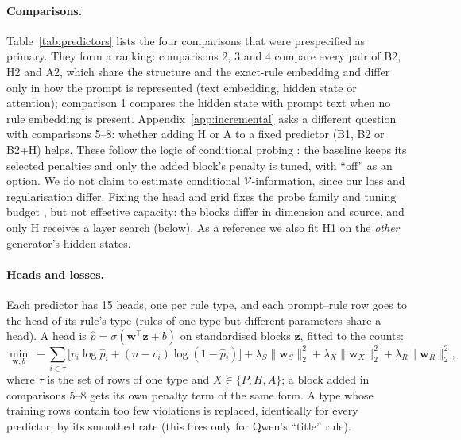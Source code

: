 \documentclass{article}
\newcommand{\blk}[1]{\textsf{#1}}
\begin{document}
\paragraph{Comparisons.} Table~\ref{tab:predictors} lists the four comparisons that were prespecified as primary. They
form a ranking: comparisons 2, 3 and 4 compare every pair of B2, H2 and A2, which share the structure and the
exact-rule embedding and differ only in how the prompt is represented (text embedding, hidden state or attention);
comparison 1 compares the hidden state with prompt text when no rule embedding is present. Appendix~\ref{app:incremental}
asks a different question with comparisons 5--8: whether adding \blk{H} or \blk{A} to a fixed predictor (B1, B2 or
B2+H) helps. These follow the logic of conditional probing \citep{hewitt2021conditional}: the baseline keeps its selected
penalties and only the added block's penalty is tuned, with ``off'' as an option. We do not claim to estimate
conditional $\mathcal{V}$-information, since our loss and regularisation differ. Fixing the head and grid fixes the probe
family and tuning budget \citep{hewitt2019control}, but not effective capacity: the blocks differ in dimension and
source, and only \blk{H} receives a layer search (below). As a reference we also fit H1 on the \emph{other} generator's hidden states.

\paragraph{Heads and losses.} Each predictor has 15 heads, one per rule type, and each
prompt--rule row goes to the head of its rule's type (rules of one type but different parameters share a head). A head
is $\hat p=\sigma(\mathbf{w}^\top\mathbf{z}+b)$ on standardised blocks $\mathbf{z}$, fitted to the counts:
\begin{equation}
\min_{\mathbf{w},b}\;-\sum_{i\in\tau}\Big[v_i\log\hat p_i+(n-v_i)\log(1-\hat p_i)\Big]
+\lambda_S\lVert\mathbf{w}_S\rVert_2^2+\lambda_X\lVert\mathbf{w}_X\rVert_2^2+\lambda_R\lVert\mathbf{w}_R\rVert_2^2,
\label{eq:obj1}
\end{equation}
where $\tau$ is the set of rows of one type and $X\in\{P,H,A\}$; a block added in comparisons 5--8 gets
its own penalty term of the same form. A type whose training rows contain too few
violations is replaced, identically for every predictor, by its smoothed rate (this fires only for Qwen's ``title''
rule).
\end{document}
